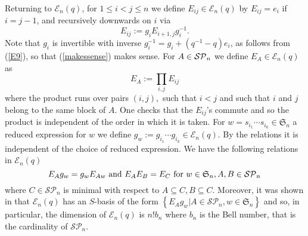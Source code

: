 \documentclass[10pt,a4,twoside,hidelinks,rm]{article}
\newcommand{\MC}{{ {Comp}}_{r,n}}
\newcommand{\Si}{\mathfrak{S}}
\newcommand{\E}{ {\mathcal E}_n(q)}
\newcommand\blambda{{\boldsymbol\lambda}}
\theoremstyle{plain}
\begin{document}
\medskip
Returning to $ \E $, for 
$ 1 \le i <j  \le  n $ we define $ E_{ij} \in \E$ by $ E_{ij} = e_i $ if $  i= j-1$, and
recursively downwards on $ i $ via 
\begin{equation}\label{makessense}
  E_{ij}:=g_{i}  E_{i+1,j} g_{i}^{-1}.
\end{equation}
Note that $ g_{i} $ is invertible with inverse $ g_i^{-1} = g_i +(q^{-1} -q) e_i $, as follows from 
(\ref{E9}), so that (\ref{makessense}) makes sense.
For $ A \in {\cal SP}_n $ we define $ E_A \in \E$ as 
\begin{equation}\label{runsoverpairs}
E_A := \prod_{i,j}   E_{ij}
\end{equation}
where the product runs over pairs $ (i,j),  $ such that $ i < j $ and such that $i $ and $ j $
belong to the same block of $ A$. One checks that the $E_{ij}$'s commute and so the
product is independent of the order in which it is taken.
For $ w = s_{i_1} \cdots s_{i_k} \in \Si_n$ a reduced expression for $w$ we define
$ g_w := g_{i_1} \cdots g_{i_k} \in \E $. By the relations it is independent of the choice of
reduced expression.
We have the following relations in $ \E$
\begin{equation}{\label{wehavetherelations}}
E_A g_w = g_w E_{ A w}  \mbox{ and } E_A E_B = E_C \mbox{  for } w\in \Si_n , A,B  \in \mathcal{SP}_n
\end{equation}
where $ C \in \mathcal{SP}_n $ is minimal with respect to $ A \subseteq C, B \subseteq C$.
Moreover, it was shown in \cite{Ry} that $ \E $ has an $S$-basis of the
form $ \left\{ E_{A} g_w | A \in \mathcal{SP}_n, w \in \Si_n \right\} $ and so, in particular,
the dimension of $ \E $ is $ n! b_n $ where $ b_n $ is the Bell number,
that is the cardinality of $ \mathcal{SP}_n $.





\end{document}
